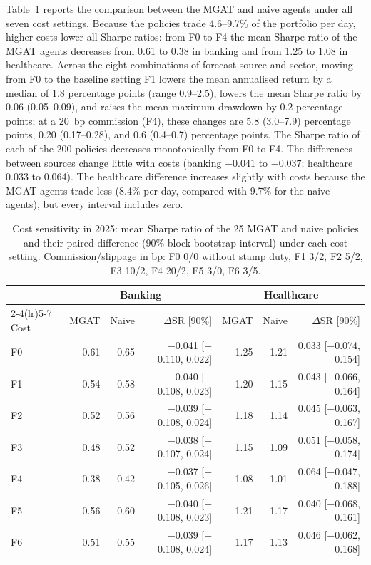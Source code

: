 \documentclass[pdflatex,sn-mathphys-num]{sn-jnl}%
\theoremstyle{thmstyleone}%
\theoremstyle{thmstyletwo}%
\theoremstyle{thmstylethree}%
\begin{document}
{\color{blue}Table~\ref{tab:cost} reports the comparison between the MGAT and naive agents under all seven cost settings. Because the policies trade 4.6--9.7\% of the portfolio per day, higher costs lower all Sharpe ratios: from F0 to F4 the mean Sharpe ratio of the MGAT agents decreases from 0.61 to 0.38 in banking and from 1.25 to 1.08 in healthcare. Across the eight combinations of forecast source and sector, moving from F0 to the baseline setting F1 lowers the mean annualised return by a median of 1.8 percentage points (range 0.9--2.5), lowers the mean Sharpe ratio by 0.06 (0.05--0.09), and raises the mean maximum drawdown by 0.2 percentage points; at a 20~bp commission (F4), these changes are 5.8 (3.0--7.9) percentage points, 0.20 (0.17--0.28), and 0.6 (0.4--0.7) percentage points. The Sharpe ratio of each of the 200 policies decreases monotonically from F0 to F4. The differences between sources change little with costs (banking $-0.041$ to $-0.037$; healthcare 0.033 to 0.064). The healthcare difference increases slightly with costs because the MGAT agents trade less (8.4\% per day, compared with 9.7\% for the naive agents), but every interval includes zero.\par}

\begin{table}[!t]\centering\small\color{blue}
\caption{Cost sensitivity in 2025: mean Sharpe ratio of the 25 MGAT and naive policies and their paired difference (90\% block-bootstrap interval) under each cost setting. Commission/slippage in bp: F0 0/0 without stamp duty, F1 3/2, F2 5/2, F3 10/2, F4 20/2, F5 3/0, F6 3/5.}
\label{tab:cost}
\setlength{\tabcolsep}{3pt}
\begin{tabular}{lrrrrrr}\toprule
 & \multicolumn{3}{c}{Banking} & \multicolumn{3}{c}{Healthcare} \\ \cmidrule(lr){2-4}\cmidrule(lr){5-7}
Cost & MGAT & Naive & $\Delta$SR [90\%] & MGAT & Naive & $\Delta$SR [90\%] \\ \midrule
F0 & 0.61 & 0.65 & $-$0.041 [$-$0.110, 0.022] & 1.25 & 1.21 & 0.033 [$-$0.074, 0.154] \\
F1 & 0.54 & 0.58 & $-$0.040 [$-$0.108, 0.023] & 1.20 & 1.15 & 0.043 [$-$0.066, 0.164] \\
F2 & 0.52 & 0.56 & $-$0.039 [$-$0.108, 0.024] & 1.18 & 1.14 & 0.045 [$-$0.063, 0.167] \\
F3 & 0.48 & 0.52 & $-$0.038 [$-$0.107, 0.024] & 1.15 & 1.09 & 0.051 [$-$0.058, 0.174] \\
F4 & 0.38 & 0.42 & $-$0.037 [$-$0.105, 0.026] & 1.08 & 1.01 & 0.064 [$-$0.047, 0.188] \\
F5 & 0.56 & 0.60 & $-$0.040 [$-$0.108, 0.023] & 1.21 & 1.17 & 0.040 [$-$0.068, 0.161] \\
F6 & 0.51 & 0.55 & $-$0.039 [$-$0.108, 0.024] & 1.17 & 1.13 & 0.046 [$-$0.062, 0.168] \\
\bottomrule\end{tabular}
\end{table}
\end{document}
